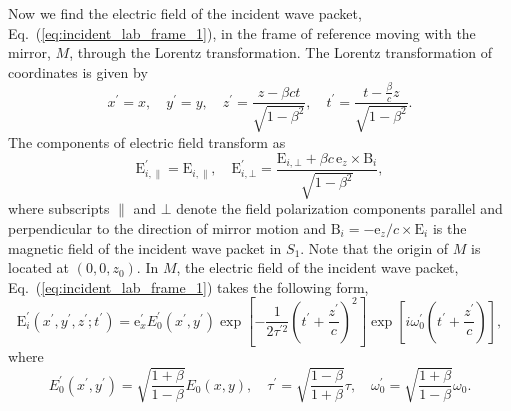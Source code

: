 \documentclass[10pt, a4paper, twoside, openright]{report}
\renewcommand{\vec}[1]{\boldsymbol{\mathrm{#1}}}
\begin{document}
Now we find the electric field of the incident wave packet, Eq.~(\ref{eq:incident_lab_frame_1}), in the frame of reference moving with the mirror, $ M $, through the Lorentz transformation. The Lorentz transformation of coordinates is given by
\begin{equation}\label{eq:lorentz_transform_coords}
x^{\prime} = x, \quad y^{\prime} = y, \quad z^{\prime} = \frac{z - \beta c t}{\sqrt{1 - \beta^2}}, \quad t^{\prime} = \frac{t - \frac{\beta}{c} z}{\sqrt{1 - \beta^2}}.
\end{equation}
The components of electric field transform as
\begin{equation}\label{eq:lorentz_transform_fields}
\vec{E}^{\prime}_{i, \parallel} = \vec{E}_{i, \parallel}, \quad \vec{E}^{\prime}_{i, \bot} = \frac{\vec{E}_{i, \bot} + \beta c \, \vec{e}_z \times \vec{B}_{i}}{\sqrt{1 - \beta^2}},
\end{equation}
where subscripts $ \parallel $ and $ \bot $ denote the field polarization components parallel and perpendicular to the direction of mirror motion and $ \vec{B}_{i} = -\vec{e}_z / c \times \vec{E}_i $ is the magnetic field of the incident wave packet in $ S_1 $. Note that the origin of $ M $ is located at $ \left( 0, 0, z_0 \right) $. In $ M $, the electric field of the incident wave packet, Eq.~(\ref{eq:incident_lab_frame_1}) takes the following form,
\begin{equation}\label{eq:incident_boost_frame}
\vec{E}^{\prime}_i \left(x^{\prime}, y^{\prime}, z^{\prime}; t^{\prime} \right) = \vec{e}_x^{\prime} E^{\prime}_0 \left(x^{\prime}, y^{\prime} \right) \exp \left[ - \frac{1}{2 \tau^{\prime 2}} \left(t^{\prime} + \frac{z^{\prime}}{c}\right)^2 \right] \exp \left[ i \omega_0^{\prime} \left(t^{\prime} + \frac{z^{\prime}}{c}\right) \right],
\end{equation}
where
\begin{equation}\label{eq:coeff_boost}
E^{\prime}_0 \left(x^{\prime}, y^{\prime} \right) = \sqrt{\frac{1 + \beta}{1 - \beta}} E_0 \left(x, y \right), \quad \tau^{\prime} = \sqrt{\frac{1 - \beta}{1 + \beta}} \tau, \quad \omega_0^{\prime} = \sqrt{\frac{1 + \beta}{1 - \beta}} \omega_0.
\end{equation}
\end{document}
